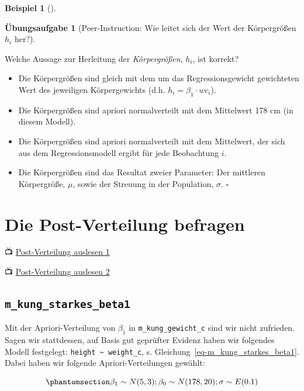 \documentclass[
  ngerman,
  letterpaper,
  twoside,
  open=any]{scrbook}
\providecommand{\tightlist}{%
  \setlength{\itemsep}{0pt}\setlength{\parskip}{0pt}}\usepackage{longtable,booktabs,array}
\theoremstyle{definition}
\newtheorem{example}{Beispiel}[chapter]
\theoremstyle{plain}
\theoremstyle{definition}
\newtheorem{exercise}{Übungsaufgabe}[chapter]
\theoremstyle{definition}
\theoremstyle{remark}
\begin{document}
\begin{example}[]
\begin{exercise}[Peer-Instruction: Wie leitet sich der Wert der
Körpergrößen \(h_i\)
her?]\protect\hypertarget{exr-wie-ensteht-mu}{}\label{exr-wie-ensteht-mu}

Welche Aussage zur Herleitung der \emph{Körpergrößen}, \(h_i\), ist
korrekt?

\begin{itemize}
\tightlist
\item
  Die Körpergrößen sind gleich mit dem um das Regressionsgewicht
  gewichteten Wert des jeweiligen Körpergewichts (d.h.
  \(h_i = \beta_1 \cdot wc_i\)).
\item
  Die Körpergrößen sind apriori normalverteilt mit dem Mittelwert 178 cm
  (in diesem Modell).
\item
  Die Körpergrößen sind apriori normalverteilt mit dem Mittelwert, der
  sich aus dem Regressionsmodell ergibt für jede Beobachtung \(i\).
\item
  Die Körpergrößen sind das Resultat zweier Parameter: Der mittleren
  Körpergröße, \(\mu\), sowie der Streuung in der Population,
  \(\sigma\). \(\square\)
\end{itemize}

\end{exercise}

\section{Die Post-Verteilung
befragen}\label{die-post-verteilung-befragen-1}

📺 \href{https://youtu.be/9ZUyN4GUNBY}{Post-Verteilung auslesen 1}

📺 \href{https://youtu.be/8NrUQ1_d7vI}{Post-Verteilung auslesen 2}

\subsection{\texorpdfstring{\texttt{m\_kung\_starkes\_beta1}}{m\_kung\_starkes\_beta1}}\label{m_kung_starkes_beta1}

Mit der Apriori-Verteilung von \(\beta_1\) in
\texttt{m\_kung\_gewicht\_c} sind wir nicht zufrieden. Sagen wir
stattdessen, auf Basis gut geprüfter Evidenz haben wir folgendes Modell
festgelegt: \texttt{height\ \textasciitilde{}\ weight\_c}, s.
Gleichung~\ref{eq-m_kung_starkes_beta1}. Dabei haben wir folgende
Apriori-Verteilungen gewählt:

\begin{equation}\protect\phantomsection\label{eq-m_kung_starkes_beta1}{\beta_1 \sim N(5,3); \\
\beta_0 \sim N(178, 20); \\
\sigma \sim E(0.1)}\end{equation}


\end{example}
\end{document}
